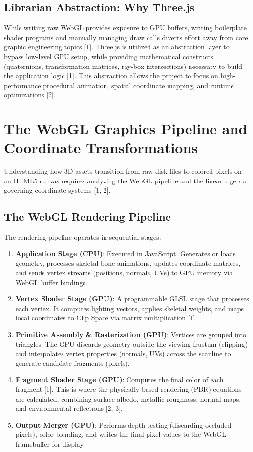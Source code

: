 \documentclass[11pt,a4paper,oneside]{article}
\begin{document}
\subsection{Librarian Abstraction: Why Three.js}
While writing raw WebGL provides exposure to GPU buffers, writing boilerplate shader programs and manually managing draw calls diverts effort away from core graphic engineering topics [1]. Three.js is utilized as an abstraction layer to bypass low-level GPU setup, while providing mathematical constructs (quaternions, transformation matrices, ray-box intersections) necessary to build the application logic [1]. This abstraction allows the project to focus on high-performance procedural animation, spatial coordinate mapping, and runtime optimizations [2].

\newpage
\section{The WebGL Graphics Pipeline and Coordinate Transformations}
Understanding how 3D assets transition from raw disk files to colored pixels on an HTML5 canvas requires analyzing the WebGL pipeline and the linear algebra governing coordinate systems [1, 2].

\subsection{The WebGL Rendering Pipeline}
The rendering pipeline operates in sequential stages:
\begin{enumerate}
    \item \textbf{Application Stage (CPU)}: Executed in JavaScript. Generates or loads geometry, processes skeletal bone animations, updates coordinate matrices, and sends vertex streams (positions, normals, UVs) to GPU memory via WebGL buffer bindings.
    \item \textbf{Vertex Shader Stage (GPU)}: A programmable GLSL stage that processes each vertex. It computes lighting vectors, applies skeletal weights, and maps local coordinates to Clip Space via matrix multiplication [1].
    \item \textbf{Primitive Assembly \& Rasterization (GPU)}: Vertices are grouped into triangles. The GPU discards geometry outside the viewing frustum (clipping) and interpolates vertex properties (normals, UVs) across the scanline to generate candidate fragments (pixels).
    \item \textbf{Fragment Shader Stage (GPU)}: Computes the final color of each fragment [1]. This is where the physically based rendering (PBR) equations are calculated, combining surface albedo, metallic-roughness, normal maps, and environmental reflections [2, 3].
    \item \textbf{Output Merger (GPU)}: Performs depth-testing (discarding occluded pixels), color blending, and writes the final pixel values to the WebGL framebuffer for display.
\end{enumerate}
\end{document}
